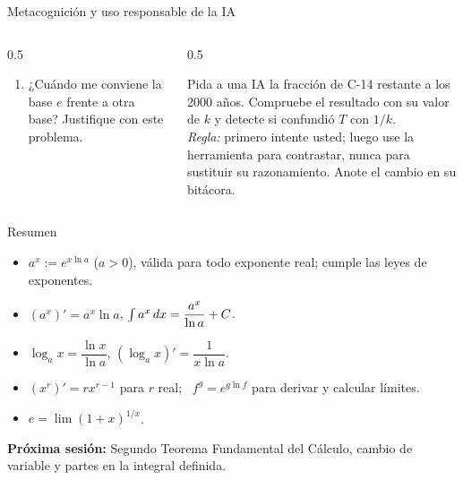 \documentclass[10pt,aspectratio=169]{beamer}
\begin{document}
\begin{frame}{Metacognición y uso responsable de la IA}
  \small
  \begin{columns}[t]
    \begin{column}{0.5\textwidth}
      \begin{metacog}
        \begin{enumerate}
          \metacomun
          \item ¿Cuándo me conviene la base $e$ frente a otra base? Justifique con este problema.
        \end{enumerate}
      \end{metacog}
    \end{column}
    \begin{column}{0.5\textwidth}
      \begin{iabox}
        Pida a una IA la fracción de C-14 restante a los 2000 años. Compruebe el resultado con su valor de $k$ y detecte si confundió $T$ con $1/k$.\\[2pt]
        \textit{Regla:} primero intente usted; luego use la herramienta para contrastar, nunca para sustituir su razonamiento. Anote el cambio en su bitácora.
      \end{iabox}
    \end{column}
  \end{columns}
\end{frame}

\begin{frame}{Resumen}
  \begin{itemize}
    \item $a^x:=e^{x\ln a}$ ($a>0$), válida para todo exponente real; cumple las leyes de exponentes.
    \item $(a^x)'=a^x\ln a$, \quad $\int a^x\,dx=\dfrac{a^x}{\ln a}+C$.
    \item $\log_ax=\dfrac{\ln x}{\ln a}$, \quad $(\log_ax)'=\dfrac{1}{x\ln a}$.
    \item $(x^r)'=rx^{r-1}$ para $r$ real; \ $f^g=e^{g\ln f}$ para derivar y calcular límites.
    \item $e=\lim(1+x)^{1/x}$.
  \end{itemize}
  \vspace{3mm}
  \textbf{Próxima sesión:} Segundo Teorema Fundamental del Cálculo, cambio de variable y partes en la integral definida.
\end{frame}
\end{document}
